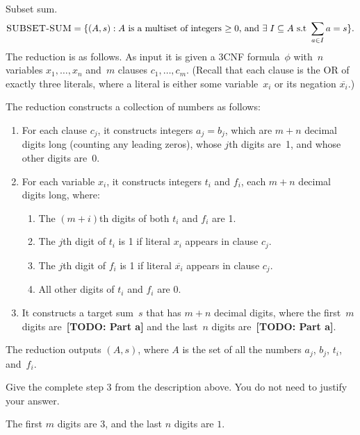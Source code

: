 \documentclass[12pt, letterpaper]{article}
\begin{document}
\begin{problem}{Subset sum.}
    \vspace{-20pt}
    \[ \textsc{SUBSET-SUM} = \{(A, s) : A \text{ is a multiset of integers $\geq 0$, and } \exists\; I \subseteq A \text{ s.t } \sum_{a \in I} a = s\}.
  \]
  The reduction is as follows.
  As input it is given a 3CNF formula~$\phi$ with~$n$ variables $x_1, \ldots, x_n$ and~$m$ clauses $c_1, \ldots, c_m$.
  (Recall that each clause is the OR of exactly three literals, where a literal is either some variable~$x_{i}$ or its negation $\overline{x_{i}}$.)

  The reduction constructs a collection of numbers as follows:

  \begin{enumerate}
  \item For each clause $c_j$, it constructs integers $a_j=b_j$, which are $m + n$ decimal digits long (counting any leading zeros), whose $j$th digits are~1, and whose other digits are~0.
  \item For each variable $x_i$, it constructs integers $t_i$ and $f_i$, each $m + n$ decimal digits long, where:
    \begin{enumerate}
    \item The $(m + i)$th digits of both $t_i$ and $f_i$ are 1.
    \item The $j$th digit of $t_i$ is 1 if literal $x_i$ appears
      in clause $c_j$.
    \item The $j$th digit of $f_i$ is 1 if literal $\overline{x_i}$
      appears in clause $c_j$.
    \item All other digits of $t_i$ and $f_i$ are 0.
    \end{enumerate}
  \item It constructs a target sum~$s$ that has $m + n$ decimal digits, where the first~$m$ digits are~\textbf{[TODO: Part a]} and the last~$n$ digits are~\textbf{[TODO: Part a]}. 
  \end{enumerate}
  The reduction outputs $(A,s)$, where $A$ is the set of all the numbers $a_{j}$, $b_{j}$, $t_{i}$, and~$f_{i}$.
\end{problem}

\begin{subproblem}{}
    Give the complete step 3 from the description above. You do not need to justify your answer.
\end{subproblem}
\begin{solution}
    The first $m$ digits are $3$, and the last $n$ digits are $1$.
\end{solution}
\end{document}
